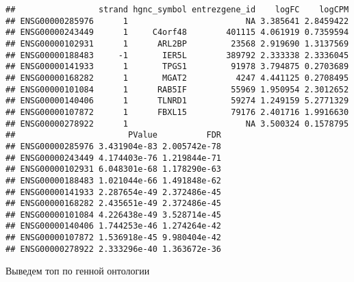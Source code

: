 \documentclass[
]{article}
\newenvironment{Shaded}{\begin{snugshade}}{\end{snugshade}}
\newcommand{\DataTypeTok}[1]{\textcolor[rgb]{0.13,0.29,0.53}{#1}}
\newcommand{\DecValTok}[1]{\textcolor[rgb]{0.00,0.00,0.81}{#1}}
\newcommand{\KeywordTok}[1]{\textcolor[rgb]{0.13,0.29,0.53}{\textbf{#1}}}
\newcommand{\NormalTok}[1]{#1}
\newcommand{\OperatorTok}[1]{\textcolor[rgb]{0.81,0.36,0.00}{\textbf{#1}}}
\newcommand{\StringTok}[1]{\textcolor[rgb]{0.31,0.60,0.02}{#1}}
\begin{document}
\begin{verbatim}
##                 strand hgnc_symbol entrezgene_id    logFC    logCPM
## ENSG00000285976      1                        NA 3.385641 2.8459422
## ENSG00000243449      1     C4orf48        401115 4.061919 0.7359594
## ENSG00000102931      1      ARL2BP         23568 2.919690 1.3137569
## ENSG00000188483     -1       IER5L        389792 2.333338 2.3336045
## ENSG00000141933      1       TPGS1         91978 3.794875 0.2703689
## ENSG00000168282      1       MGAT2          4247 4.441125 0.2708495
## ENSG00000101084      1      RAB5IF         55969 1.950954 2.3012652
## ENSG00000140406      1      TLNRD1         59274 1.249159 5.2771329
## ENSG00000107872      1      FBXL15         79176 2.401716 1.9916630
## ENSG00000278922      1                        NA 3.500324 0.1578795
##                       PValue          FDR
## ENSG00000285976 3.431904e-83 2.005742e-78
## ENSG00000243449 4.174403e-76 1.219844e-71
## ENSG00000102931 6.048301e-68 1.178290e-63
## ENSG00000188483 1.021044e-66 1.491848e-62
## ENSG00000141933 2.287654e-49 2.372486e-45
## ENSG00000168282 2.435651e-49 2.372486e-45
## ENSG00000101084 4.226438e-49 3.528714e-45
## ENSG00000140406 1.744253e-46 1.274264e-42
## ENSG00000107872 1.536918e-45 9.980404e-42
## ENSG00000278922 2.333296e-40 1.363672e-36
\end{verbatim}

Выведем топ по генной онтологии

\begin{Shaded}
\end{Shaded}
\end{document}
